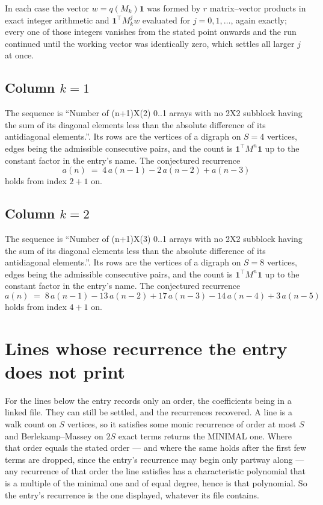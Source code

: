 \documentclass[11pt,a4paper]{article}
\theoremstyle{plain}
\theoremstyle{definition}
\begin{document}
In each case the vector $w=q(M_k)\mathbf{1}$ was formed by $r$ matrix--vector products in
exact integer arithmetic and $\mathbf{1}^{\!\top}M_k^{j}w$ evaluated for $j=0,1,\dots$,
again exactly; every one of those integers vanishes from the stated point onwards and the run
continued until the working vector was identically zero, which settles all larger $j$ at once.

\subsection*{Column $k$$=1$}
The sequence is ``Number of (n+1)X(2) 0..1 arrays with no 2X2 subblock having the sum of its diagonal elements less than the absolute difference of its antidiagonal elements.''. Its rows are the vertices of a digraph on
$S=4$ vertices, edges being the admissible consecutive pairs, and the count is
$\mathbf{1}^{\!\top}M^{n}\mathbf{1}$ up to the constant factor in the entry's name.
The conjectured recurrence
\[
a(n)\;=\;4\,a(n-1) - 2\,a(n-2) + a(n-3)
\]
holds from index $2+1$ on.

\subsection*{Column $k$$=2$}
The sequence is ``Number of (n+1)X(3) 0..1 arrays with no 2X2 subblock having the sum of its diagonal elements less than the absolute difference of its antidiagonal elements.''. Its rows are the vertices of a digraph on
$S=8$ vertices, edges being the admissible consecutive pairs, and the count is
$\mathbf{1}^{\!\top}M^{n}\mathbf{1}$ up to the constant factor in the entry's name.
The conjectured recurrence
\[
a(n)\;=\;8\,a(n-1) - 13\,a(n-2) + 17\,a(n-3) - 14\,a(n-4) + 3\,a(n-5)
\]
holds from index $4+1$ on.


\section{Lines whose recurrence the entry does not print}

For the lines below the entry records only an order, the coefficients being in a linked file.
They can still be settled, and the recurrences recovered. A line is a walk count on $S$
vertices, so it satisfies some monic recurrence of order at most $S$ and Berlekamp--Massey on
$2S$ exact terms returns the MINIMAL one. Where that order equals the stated order --- and
where the same holds after the first few terms are dropped, since the entry's recurrence may
begin only partway along --- any recurrence of that order the line satisfies has a
characteristic polynomial that is a multiple of the minimal one and of equal degree, hence is
that polynomial. So the entry's recurrence is the one displayed, whatever its file contains.
\end{document}
